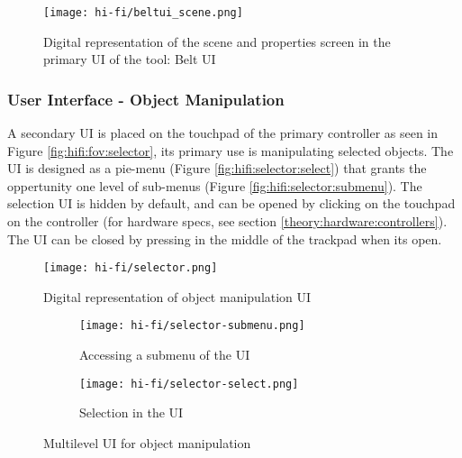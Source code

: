 
\begin{figure}
  \centering
  \texttt{[image: hi-fi/beltui\_scene.png]}
\caption{Digital representation of the scene and properties screen in the primary UI of the tool: Belt UI}
\label{fig:hifi:scenescreen}
\end{figure}

\subsubsection{User Interface - Object Manipulation}
\label{result:hifi:selector}
A secondary UI is placed on the touchpad of the primary controller as seen in Figure \ref{fig:hifi:fov:selector}, its primary use is manipulating selected objects. The UI is designed as a pie-menu (Figure \ref{fig:hifi:selector:select}) that grants the oppertunity one level of sub-menus (Figure \ref{fig:hifi:selector:submenu}). The selection UI is hidden by default, and can be opened by clicking on the touchpad on the controller (for hardware specs, see section \ref{theory:hardware:controllers}). The UI can be closed by pressing in the middle of the trackpad when its open.

\begin{figure}
  \centering
  \texttt{[image: hi-fi/selector.png]}
\caption{Digital representation of object manipulation UI}
\label{fig:hifi:selector}
\end{figure}

\begin{figure}
\begin{subfigure}{.5\textwidth}
  \centering
  \texttt{[image: hi-fi/selector-submenu.png]}
  \caption{Accessing a submenu of the UI}
  \label{fig:lofi:selector:select}
\end{subfigure}%
\begin{subfigure}{.5\textwidth}
  \centering
  \texttt{[image: hi-fi/selector-select.png]}
  \caption{Selection in the UI}
  \label{fig:lofi:selector:submenu}
\end{subfigure}
\caption{Multilevel UI for object manipulation}
\label{fig:lofi:selector}
\end{figure}

